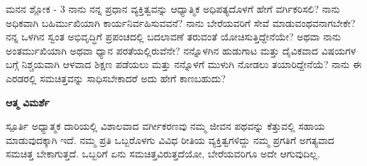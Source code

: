 \newpage
\begin{mananam}{\mananamfont ಮನನ ಶ್ಲೋಕ - \textenglish{3}}
\footnotesize \mananamtext ನಾನು ನನ್ನ ಪ್ರಧಾನ ವ್ಯಕ್ತಿತ್ವವನ್ನು ಆಧ್ಯಾತ್ಮಿಕ ಅಧಿಪತ್ಯದೊಳಗೆ ಹೇಗೆ ವರ್ಗಿಕರಿಸಲಿ? ನಾನು ಅಧಿಕವಾಗಿ ಬಹಿರ್ಮುಖಿಯಾಗಿ ಕಾರ್ಯನಿರ್ವಹಿಸುವವನೆ? ನಾನು ಬೇರೆಯವರಿಗೆ ಸೇವೆ ಮಾಡುವಂಥವನಾಗಬೇಕೇ? ನನ್ನ ಒಳಗಿನ  ಸ್ವಂತ ಅಭಿವೃದ್ಧಿಗೆ ಪ್ರಪಂಚದಲ್ಲಿ ಬದಲಾವಣೆ ತರುವಂತೆ ಯೋಚಿಸುತ್ತಿದ್ದೇನೆಯೇ? ಅಥವಾ ನಾನು ಅಂತರ್ಮುಖಿಯಾಗಿ ಅಥವಾ ಧ್ಯಾನ ಪರತೆಯಲ್ಲಿರುವೆನೇ? ನನ್ನೊಳಗಿನ ಹುಡುಗಾಟ ಮತ್ತು ದೈವಿಕವಾದ ವಿಷಯಗಳ ಬಗ್ಗೆ ನಿಶ್ಚಯವಾಗಿ ಆಳವಾದ ಶಿಕ್ಷಣ ಪಡೆಯಲು ಮತ್ತು ನನ್ನೊಳಗೆ ಮುಳುಗಿ ನೋಡಲು ತಯಾರಿದ್ದೇನೆಯೆ? ನಾನು ಈ ಎರಡರಲ್ಲಿ ಸಮಚಿತ್ತವನ್ನು ಸಾಧಿಸಬೇಕಾದರೆ ಅದು ಹೇಗೆ ಕಾಣಬಹುದು?
\end{mananam}
\WritingHand\enspace\textbf{ಆತ್ಮ ವಿಮರ್ಶೆ}\\
\begin{inspiration}{\mananamfont ಸ್ಪೂರ್ತಿ}
\footnotesize \mananamtext ಅಧ್ಯಾತ್ಮಕ ದಾರಿಯಲ್ಲಿ ವಿಶಾಲವಾದ ವರ್ಗೀಕರಣವು ನಮ್ಮ ಜೀವನ ಪಥವನ್ನು ಕೆತ್ತುವಲ್ಲಿ ಸಹಾಯ ಮಾಡುವುದಕ್ಕಾಗಿ ಇದೆ. ನಮ್ಮ ಪ್ರತಿ ಒಬ್ಬರೊಳಗು ವಿವಿಧ ರೀತಿಯ ವ್ಯಕ್ತಿತ್ವಗಳಿದ್ದು ನಮ್ಮ ಪ್ರಗತಿಗೆ ಅಗತ್ಯವಾದ ಸಮಚಿತ್ತ ಬೇಕಾಗುತ್ತದೆ. ಒಬ್ಬರಿಗೆ ಏನು ಸಮಚಿತ್ತವಿರುತ್ತದೆಯೋ, ಬೇರೆಯವರಿಗೂ ಅದೇ ಆಗುವುದಿಲ್ಲ.
\end{inspiration}
\newpage


